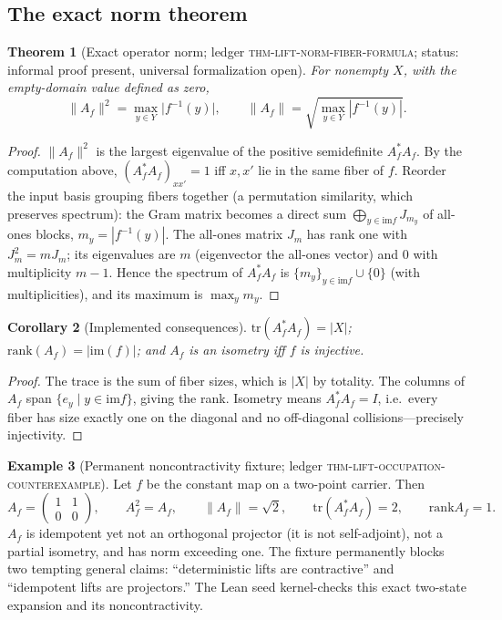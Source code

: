 \documentclass[11pt]{amsart}
\newtheorem{theorem}{Theorem}[section]
\newtheorem{corollary}[theorem]{Corollary}
\theoremstyle{definition}
\newtheorem{example}[theorem]{Example}
\theoremstyle{remark}
\newcommand{\im}{\mathrm{im}}
\newcommand{\rank}{\mathrm{rank}}
\newcommand{\tr}{\mathrm{tr}}
\begin{document}
\subsection{The exact norm theorem}

\begin{theorem}[Exact operator norm; \textnormal{ledger \textsc{thm-lift-norm-fiber-formula}; status: informal proof present, universal formalization open}]\label{thm:norm}
For nonempty $X$, with the empty-domain value defined as zero,
\[
\lVert A_f\rVert^2=\max_{y\in Y}\bigl|f^{-1}(y)\bigr| ,\qquad
\lVert A_f\rVert=\sqrt{\max_{y\in Y}|f^{-1}(y)|}.
\]
\end{theorem}

\begin{proof}
$\lVert A_f\rVert^2$ is the largest eigenvalue of the positive semidefinite $A_f^{*}A_f$. By the computation above, $(A_f^*A_f)_{xx'}=1$ iff $x,x'$ lie in the same fiber of $f$. Reorder the input basis grouping fibers together (a permutation similarity, which preserves spectrum): the Gram matrix becomes a direct sum $\bigoplus_{y\in\im f}J_{m_y}$ of all-ones blocks, $m_y=|f^{-1}(y)|$. The all-ones matrix $J_m$ has rank one with $J_m^2=mJ_m$; its eigenvalues are $m$ (eigenvector the all-ones vector) and $0$ with multiplicity $m-1$. Hence the spectrum of $A_f^*A_f$ is $\{m_y\}_{y\in\im f}\cup\{0\}$ (with multiplicities), and its maximum is $\max_y m_y$.
\end{proof}

\begin{corollary}[Implemented consequences]\label{cor:conseq}
$\tr(A_f^{*}A_f)=|X|$; $\rank(A_f)=|\im(f)|$; and $A_f$ is an isometry iff $f$ is injective.
\end{corollary}

\begin{proof}
The trace is the sum of fiber sizes, which is $|X|$ by totality. The columns of $A_f$ span $\{e_y \mid y\in\im f\}$, giving the rank. Isometry means $A_f^*A_f=I$, i.e.\ every fiber has size exactly one on the diagonal and no off-diagonal collisions---precisely injectivity.
\end{proof}

\begin{example}[Permanent noncontractivity fixture; \textnormal{ledger \textsc{thm-lift-occupation-counterexample}}]\label{ex:constant}
Let $f$ be the constant map on a two-point carrier. Then
\[
A_f=\begin{pmatrix}1&1\\0&0\end{pmatrix},\qquad
A_f^2=A_f,\qquad
\lVert A_f\rVert=\sqrt{2},\qquad
\tr(A_f^*A_f)=2,\qquad \rank A_f=1 .
\]
$A_f$ is idempotent yet not an orthogonal projector (it is not self-adjoint), not a partial isometry, and has norm exceeding one. The fixture permanently blocks two tempting general claims: ``deterministic lifts are contractive'' and ``idempotent lifts are projectors.'' The Lean seed kernel-checks this exact two-state expansion and its noncontractivity.
\end{example}
\end{document}
